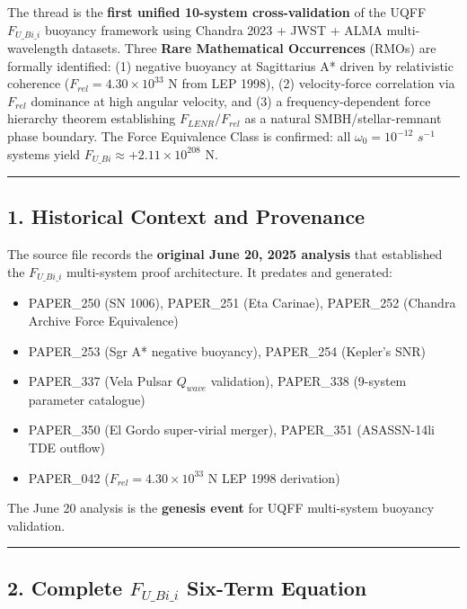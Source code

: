 \documentclass[
  11pt,
]{article}
\providecommand{\tightlist}{%
  \setlength{\itemsep}{0pt}\setlength{\parskip}{0pt}}
\begin{document}
The thread is the \textbf{first unified 10-system cross-validation} of
the UQFF \(F_{U\_Bi\_i}\) buoyancy framework using Chandra 2023 + JWST +
ALMA multi-wavelength datasets. Three \textbf{Rare Mathematical
Occurrences} (RMOs) are formally identified: (1) negative buoyancy at
Sagittarius A* driven by relativistic coherence
(\(F_{rel} = 4.30 \times 10^{33}\) N from LEP 1998), (2) velocity-force
correlation via \(F_{rel}\) dominance at high angular velocity, and (3)
a frequency-dependent force hierarchy theorem establishing
\(F_{LENR}/F_{rel}\) as a natural SMBH/stellar-remnant phase boundary.
The Force Equivalence Class is confirmed: all \(\omega_0 = 10^{-12}\)
\(s^{-1}\) systems yield \(F_{U\_Bi} \approx +2.11 \times 10^{208}\) N.

\begin{center}\rule{0.5\linewidth}{0.5pt}\end{center}

\subsection{1. Historical Context and
Provenance}\label{historical-context-and-provenance}

The source file records the \textbf{original June 20, 2025 analysis}
that established the \(F_{U\_Bi\_i}\) multi-system proof architecture.
It predates and generated:

\begin{itemize}
\tightlist
\item
  PAPER\_250 (SN 1006), PAPER\_251 (Eta Carinae), PAPER\_252 (Chandra
  Archive Force Equivalence)
\item
  PAPER\_253 (Sgr A* negative buoyancy), PAPER\_254 (Kepler's SNR)
\item
  PAPER\_337 (Vela Pulsar \(Q_{wave}\) validation), PAPER\_338 (9-system
  parameter catalogue)
\item
  PAPER\_350 (El Gordo super-virial merger), PAPER\_351 (ASASSN-14li TDE
  outflow)
\item
  PAPER\_042 (\(F_{rel} = 4.30 \times 10^{33}\) N LEP 1998 derivation)
\end{itemize}

The June 20 analysis is the \textbf{genesis event} for UQFF multi-system
buoyancy validation.

\begin{center}\rule{0.5\linewidth}{0.5pt}\end{center}

\subsection{\texorpdfstring{2. Complete \(F_{U\_Bi\_i}\) Six-Term
Equation}{2. Complete F\_\{U\textbackslash\_Bi\textbackslash\_i\} Six-Term Equation}}\label{complete-f_u_bi_i-six-term-equation}
\end{document}
